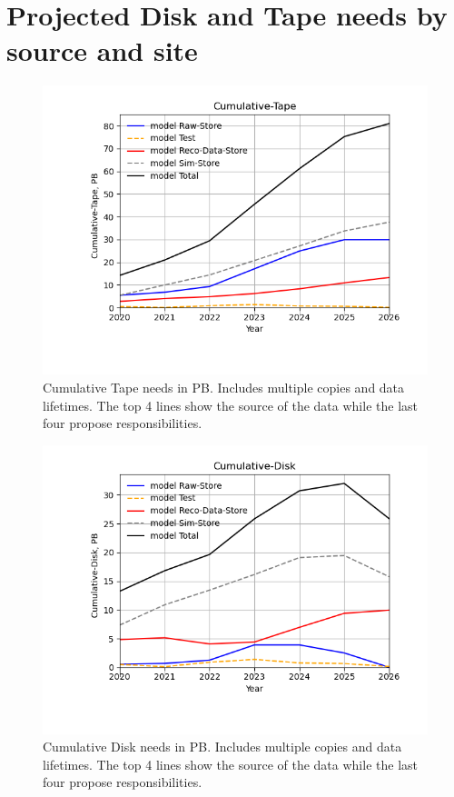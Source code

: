 \section{Projected Disk and Tape needs by source and site}
\begin{figure}[h]
\centering\includegraphics[height=0.4\textwidth]{MoreSim_2022-12-04-2026/MoreSim_2022-12-04-2026-Cumulative-Tape.png}
\caption{Cumulative Tape needs in PB. Includes multiple copies and data lifetimes. The top 4 lines show the source of the data while the last four propose responsibilities.}
\label{fig:Cumulative-Tape}
\end{figure}
\begin{figure}[h]
\centering\includegraphics[height=0.4\textwidth]{MoreSim_2022-12-04-2026/MoreSim_2022-12-04-2026-Cumulative-Disk.png}
\caption{Cumulative Disk needs in PB. Includes multiple copies and data lifetimes. The top 4 lines show the source of the data while the last four propose responsibilities.}
\label{fig:Cumulative-Disk}
\end{figure}
